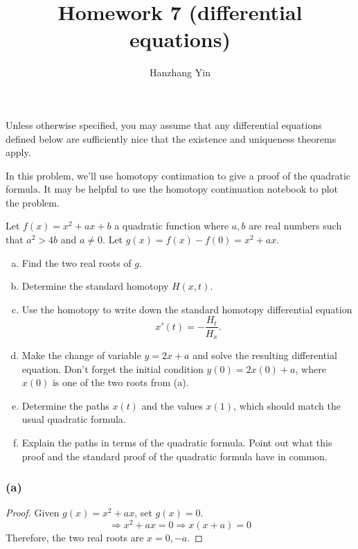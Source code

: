 \documentclass{article}
\title{\vspace{-4em}Homework 7 (differential equations)}
\author{Hanzhang Yin}
\begin{document}
\maketitle

Unless otherwise specified, you may assume that any differential equations defined below are sufficiently nice that the existence and uniqueness theorems apply.



\begin{problem}
    In this problem, we'll use homotopy continuation to give a proof of the quadratic formula. It may be helpful to use the homotopy continuation notebook to plot the problem.

    \hspace{2em} Let \(f(x) = x^2 + ax + b\) a quadratic function where \(a,b\) are real numbers such that \(a^2>4b\) and \(a\neq 0\). Let \(g(x) = f(x) -f(0) = x^2 + ax\).
    \begin{enumerate}[a)]
        \item Find the two real roots of \(g\).
        \item Determine the standard homotopy \(H(x,t)\).
        \item Use the homotopy to write down the standard homotopy differential equation
        \[x'(t) = - \frac{H_t}{H_x}.\]
        \item Make the change of variable \(y=2x+a\) and solve the resulting differential equation.
        Don't forget the initial condition \(y(0)=2x(0) + a\), where \(x(0)\) is one of the two roots from (a).
        \item Determine the paths \(x(t)\) and the values \(x(1)\), which should match the usual quadratic formula.
        \item Explain the paths in terms of the quadratic formula. Point out what this proof and the standard proof of the quadratic formula have in common.
    \end{enumerate}
\end{problem}

\subsubsection*{(a)}
\begin{proof}
    Given $g(x) = x^2 + ax$, set $g(x) = 0$.
    \[ \Rightarrow x^2 + ax = 0 \Rightarrow x(x + a) = 0 \]
    Therefore, the two real roots are $x = 0, -a$. 
\end{proof}
\end{document}
